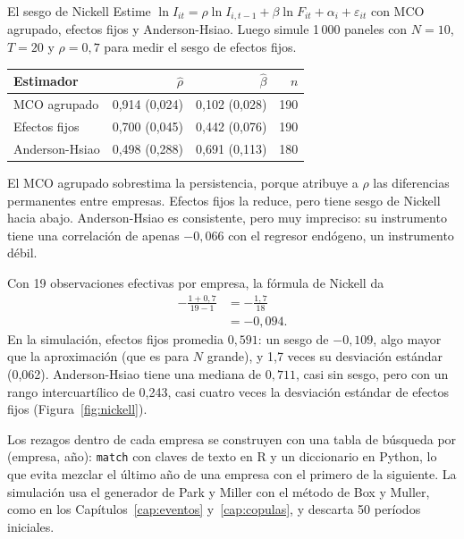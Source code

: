 \begin{ejresuelto}{El sesgo de Nickell}\label{ej:nickell}
\enunciado Estime $\ln I_{it}=\rho\ln I_{i,t-1}+\beta\ln F_{it}+\alpha_i+\varepsilon_{it}$ con MCO agrupado, efectos fijos y Anderson-Hsiao. Luego
simule 1\,000 paneles con $N=10$, $T=20$ y $\rho=0{,}7$ para medir el sesgo de efectos fijos.

\solucion
{}
\begin{center}\small
\begin{tabular}{@{}lrrr@{}}
\toprule
Estimador & $\hat\rho$ & $\hat\beta$ & $n$ \\
\midrule
MCO agrupado & 0,914 (0,024) & 0,102 (0,028) & 190 \\
Efectos fijos & 0,700 (0,045) & 0,442 (0,076) & 190 \\
Anderson-Hsiao & 0,498 (0,288) & 0,691 (0,113) & 180 \\
\bottomrule
\end{tabular}
\end{center}
El MCO agrupado sobrestima la persistencia, porque atribuye a $\rho$ las diferencias permanentes entre empresas. Efectos fijos la
reduce, pero tiene sesgo de Nickell hacia abajo. Anderson-Hsiao es consistente, pero muy impreciso: su instrumento tiene una
correlación de apenas $-0{,}066$ con el regresor endógeno, un instrumento débil.

 Con 19 observaciones efectivas por empresa, la fórmula de Nickell da
\begin{align*}
  -\frac{1+0{,}7}{19-1} &= -\frac{1{,}7}{18}\\
                       &= -0{,}094 .
\end{align*}
En la simulación, efectos fijos promedia $0{,}591$: un sesgo de $-0{,}109$, algo mayor que la aproximación (que es para $N$ grande), y
1,7 veces su desviación estándar (0,062). Anderson-Hsiao tiene una mediana de $0{,}711$, casi sin sesgo, pero con un rango
intercuartílico de 0,243, casi cuatro veces la desviación estándar de efectos fijos (Figura~\ref{fig:nickell}).


\RvsPy Los rezagos dentro de cada empresa se construyen con una tabla de búsqueda por (empresa, año): \texttt{match} con claves de
texto en R y un diccionario en Python, lo que evita mezclar el último año de una empresa con el primero de la siguiente. La
simulación usa el generador de Park y Miller con el método de Box y Muller, como en los Capítulos~\ref{cap:eventos}
y~\ref{cap:copulas}, y descarta 50 períodos iniciales.


\end{ejresuelto}
